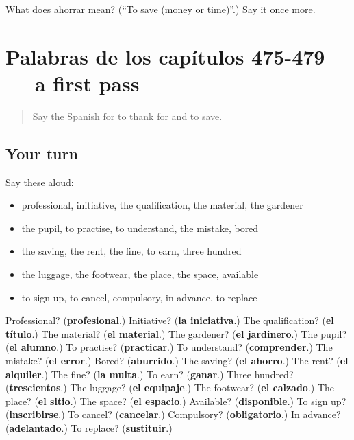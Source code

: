\begin{tcolorbox}[breakable,colback=teal!4,colframe=teal!35!black,title={Before you move on}]
What does ahorrar mean? (\textquotedblleft{}To save (money or time)\textquotedblright{}.) Say it once more.
\end{tcolorbox}
\section[(dialogue)]{Palabras de los capítulos 475-479 — a first pass}

\label{lesson:ES-R484-repaso-palabras-de-los-capitulos-475-479}



\begin{quote}
Say the Spanish for to thank for and to save.
\end{quote}

\subsection*{Your turn}
Say these aloud:

\begin{itemize}
\raggedright
  \item professional, initiative, the qualification, the material, the gardener
  \item the pupil, to practise, to understand, the mistake, bored
  \item the saving, the rent, the fine, to earn, three hundred
  \item the luggage, the footwear, the place, the space, available
  \item to sign up, to cancel, compulsory, in advance, to replace
\end{itemize}

\begin{tcolorbox}[breakable,colback=teal!4,colframe=teal!35!black,title={Before you move on}]
Professional? (\textbf{profesional}.) Initiative? (\textbf{la iniciativa}.) The qualification? (\textbf{el título}.) The material? (\textbf{el material}.) The gardener? (\textbf{el jardinero}.) The pupil? (\textbf{el alumno}.) To practise? (\textbf{practicar}.) To understand? (\textbf{comprender}.) The mistake? (\textbf{el error}.) Bored? (\textbf{aburrido}.) The saving? (\textbf{el ahorro}.) The rent? (\textbf{el alquiler}.) The fine? (\textbf{la multa}.) To earn? (\textbf{ganar}.) Three hundred? (\textbf{trescientos}.) The luggage? (\textbf{el equipaje}.) The footwear? (\textbf{el calzado}.) The place? (\textbf{el sitio}.) The space? (\textbf{el espacio}.) Available? (\textbf{disponible}.) To sign up? (\textbf{inscribirse}.) To cancel? (\textbf{cancelar}.) Compulsory? (\textbf{obligatorio}.) In advance? (\textbf{adelantado}.) To replace? (\textbf{sustituir}.)
\end{tcolorbox}
